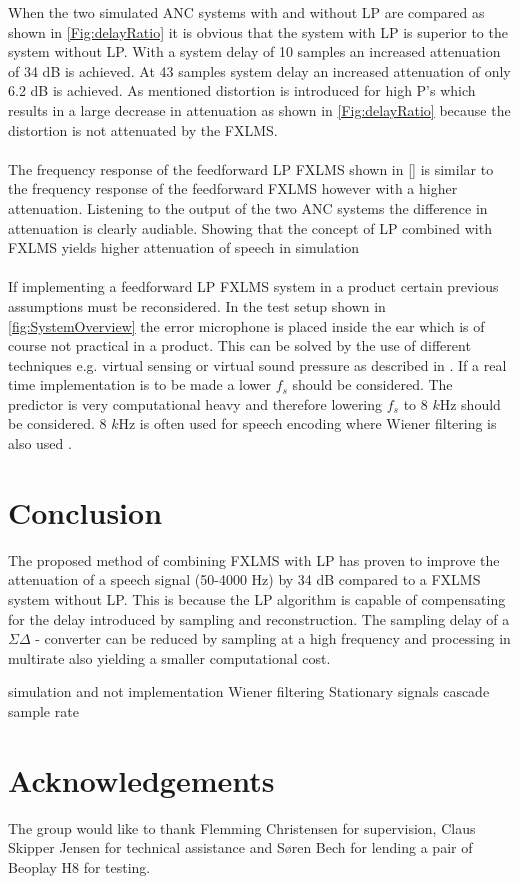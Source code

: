 When the two simulated ANC systems with and without LP are compared as shown in \autoref{Fig:delayRatio} it is obvious that the system with LP is superior to the system without LP. With a system delay of 10 samples an increased attenuation of 34 dB is achieved. At 43 samples system delay an increased attenuation of only 6.2 dB is achieved. As mentioned distortion is introduced for high P's which results in a large decrease in attenuation as shown in \autoref{Fig:delayRatio} because the distortion is not attenuated by the FXLMS.
\\\\
The frequency response of the feedforward LP FXLMS shown in \autoref{} is similar to the frequency response of the feedforward FXLMS however with a higher attenuation. Listening to the output of the two ANC systems the difference in attenuation is clearly audiable. Showing that the concept of LP combined with FXLMS yields higher attenuation of speech in simulation     
\\\\
If implementing a feedforward LP FXLMS system in a product certain previous assumptions must be reconsidered. In the test setup shown in \autoref{fig:SystemOverview} the error microphone is placed inside the ear which is of course not practical in a product. This can be solved by the use of different techniques e.g. virtual sensing or virtual sound pressure as described in \cite{Hansen2}. If a real time implementation is to be made a lower $f_s$ should be considered. The predictor is very computational heavy and therefore lowering $f_s$ to 8 $k$Hz should be considered. 8 $k$Hz is often used for speech encoding where Wiener filtering is also used \cite{Speech}.



\section{Conclusion}
The proposed method of combining FXLMS with LP has proven to improve the attenuation of a speech signal (50-4000 Hz) by 34 dB compared to a FXLMS system without LP. This is because the LP algorithm is capable of compensating for the delay introduced by sampling and reconstruction. The sampling delay of a $\Sigma\Delta$ - converter can be reduced by sampling at a high frequency and processing in multirate also yielding a smaller computational cost.    


simulation and not implementation   
Wiener filtering
Stationary signals
cascade
sample rate




\section*{Acknowledgements}
The group would like to thank Flemming Christensen for supervision, Claus Skipper Jensen for technical assistance and Søren Bech for lending a pair of Beoplay H8 for testing. 
